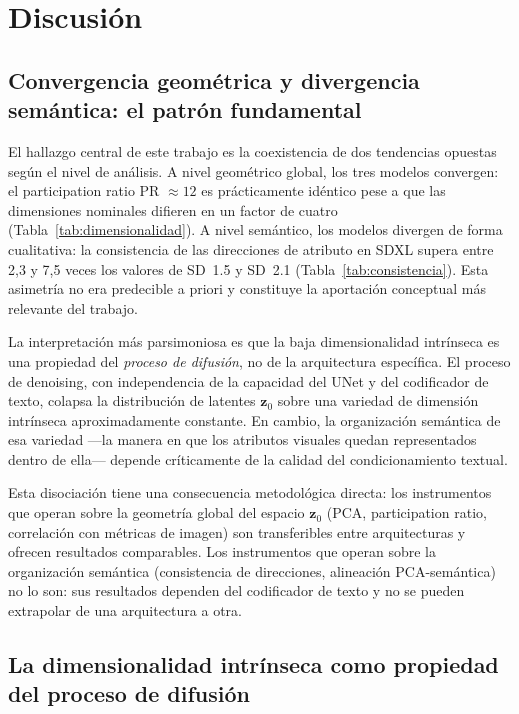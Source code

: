 \documentclass[12pt, a4paper, twoside]{book}
\newcommand{\z}{\mathbf{z}}
\begin{document}
\chapter{Discusión}
\label{ch:discusion}

\section{Convergencia geométrica y divergencia semántica: el patrón fundamental}
\label{sec:dis:patron}

El hallazgo central de este trabajo es la coexistencia de dos tendencias opuestas según el nivel de análisis. A nivel geométrico global, los tres modelos convergen: el participation ratio PR $\approx 12$ es prácticamente idéntico pese a que las dimensiones nominales difieren en un factor de cuatro (Tabla~\ref{tab:dimensionalidad}). A nivel semántico, los modelos divergen de forma cualitativa: la consistencia de las direcciones de atributo en SDXL supera entre 2,3 y 7,5 veces los valores de SD~1.5 y SD~2.1 (Tabla~\ref{tab:consistencia}). Esta asimetría no era predecible a priori y constituye la aportación conceptual más relevante del trabajo.

La interpretación más parsimoniosa es que la baja dimensionalidad intrínseca es una propiedad del \textit{proceso de difusión}, no de la arquitectura específica. El proceso de denoising, con independencia de la capacidad del UNet y del codificador de texto, colapsa la distribución de latentes $\z_0$ sobre una variedad de dimensión intrínseca aproximadamente constante. En cambio, la organización semántica de esa variedad ---la manera en que los atributos visuales quedan representados dentro de ella--- depende críticamente de la calidad del condicionamiento textual.

Esta disociación tiene una consecuencia metodológica directa: los instrumentos que operan sobre la geometría global del espacio $\z_0$ (PCA, participation ratio, correlación con métricas de imagen) son transferibles entre arquitecturas y ofrecen resultados comparables. Los instrumentos que operan sobre la organización semántica (consistencia de direcciones, alineación PCA-semántica) no lo son: sus resultados dependen del codificador de texto y no se pueden extrapolar de una arquitectura a otra.

\section{La dimensionalidad intrínseca como propiedad del proceso de difusión}
\label{sec:dis:dimensionalidad}
\end{document}
